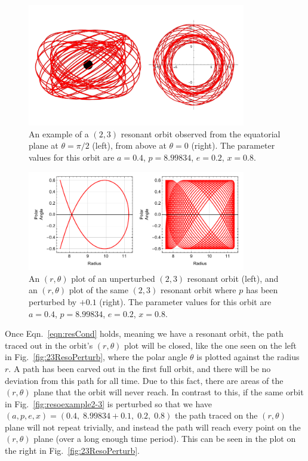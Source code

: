 \begin{figure}[!ht]
    \centering
    \includegraphics[width=0.85\textwidth]{images/resoTopSide.pdf}
    \caption[Resonant orbit example]{An example of a $(2,3)$ resonant orbit observed from the equatorial plane at $\theta=\pi/2$ (left), from above at $\theta=0$ (right). The parameter values for this orbit are $a=0.4$, $p=8.99834$, $e=0.2$, $x=0.8$.}
    \label{fig:resoexample2-3}
\end{figure}

\begin{figure}[!ht]
    \centering
    \includegraphics[width=0.85\textwidth]{images/resorThPlusPert.pdf}
    \caption[Two $(r,\theta)$ plots showing an unperturbed and a perturbed resonant orbit]{An $(r,\theta)$ plot of an unperturbed  $(2,3)$ resonant orbit (left), and an $(r,\theta)$ plot of the same $(2,3)$ resonant orbit where $p$ has been perturbed by $+0.1$ (right). The parameter values for this orbit are $a=0.4$, $p=8.99834$, $e=0.2$, $x=0.8$.}
    \label{fig:23ResoPerturb}
\end{figure}

Once Eqn.~\eqref{eqn:resCond} holds, meaning we have a resonant orbit, the path traced out in the orbit's $(r,\theta)$ plot will be closed, like the one seen on the left in Fig.~\eqref{fig:23ResoPerturb}, where the polar angle $\theta$ is plotted against the radius $r$.
A path has been carved out in the first full orbit, and there will be no deviation from this path for all time.
Due to this fact, there are areas of the $(r,\theta)$ plane that the orbit will never reach.
In contrast to this, if the same orbit in Fig.~\eqref{fig:resoexample2-3} is perturbed so that we have $(a,p,e,x)=(0.4,\;8.99834+0.1,\;0.2,\;0.8)$ the path traced on the $(r,\theta)$ plane will not repeat trivially, and instead the path will reach every point on the $(r,\theta)$ plane (over a long enough time period).
This can be seen in the plot on the right in Fig.~\eqref{fig:23ResoPerturb}.

